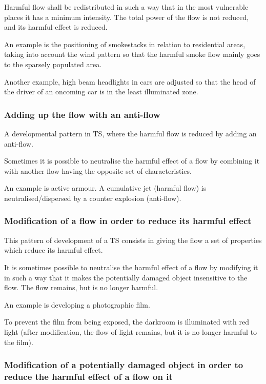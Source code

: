 \documentclass[a4paper,11pt]{article}
\begin{document}
Harmful flow shall be redistributed in such a way that in the most vulnerable
places it has a minimum intensity. The total power of the flow is not reduced,
and its harmful effect is reduced.

An example is the positioning of smokestacks in relation to residential areas,
taking into account the wind pattern so that the harmful smoke flow mainly
goes to the sparsely populated area.

Another example, high beam headlights in cars are adjusted so that the head of
the driver of an oncoming car is in the least illuminated zone.

\subsubsection{Adding up the flow with an anti-flow}

A developmental pattern in TS, where the harmful flow is reduced by adding an
anti-flow.

Sometimes it is possible to neutralise the harmful effect of a flow by
combining it with another flow having the opposite set of characteristics.

An example is active armour. A cumulative jet (harmful flow) is
neutralised/dispersed by a counter explosion (anti-flow).

\subsubsection{Modification of a flow in order to reduce its harmful effect}

This pattern of development of a TS consists in giving the flow a set of
properties which reduce its harmful effect.

It is sometimes possible to neutralise the harmful effect of a flow by
modifying it in such a way that it makes the potentially damaged object
insensitive to the flow. The flow remains, but is no longer harmful.

An example is developing a photographic film.

To prevent the film from being exposed, the darkroom is illuminated with red
light (after modification, the flow of light remains, but it is no longer
harmful to the film).

\subsubsection{Modification of a potentially damaged object in order to reduce
  the harmful effect of a flow on it} 
\end{document}

